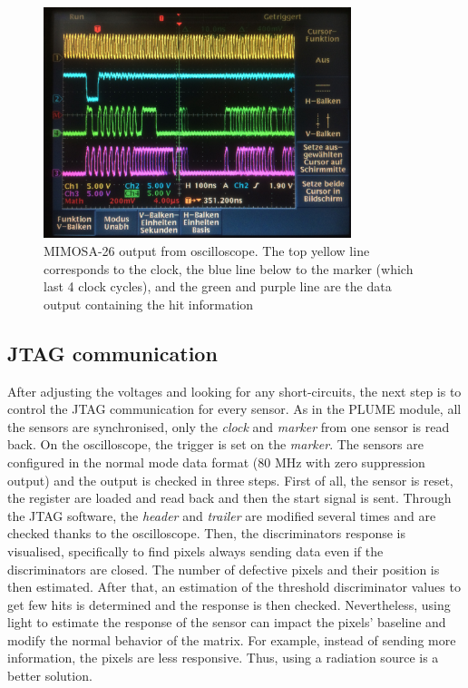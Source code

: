   \begin{figure}[h]
    \centering
    \includegraphics[width=0.8\textwidth]{Pictures/labTests/mi26_output}
    \caption{MIMOSA-26 output from oscilloscope. The top yellow line corresponds to the clock, the blue line below to the marker (which last 4 clock cycles), and the green and purple line are the data output containing the hit information}
    \label{fig:mi26Output}
  \end{figure}

  \subsection{JTAG communication}

  After adjusting the voltages and looking for any short-circuits, the next step is to control the JTAG communication for every sensor.
  As in the PLUME module, all the sensors are synchronised, only the \textit{clock} and \textit{marker} from one sensor is read back.
  On the oscilloscope, the trigger is set on the \textit{marker}.  
  The sensors are configured in the normal mode data format (80 MHz with zero suppression output) and the output is checked in three steps.
  First of all, the sensor is reset, the register are loaded and read back and then the start signal is sent. 
  Through the JTAG software, the \textit{header} and \textit{trailer} are modified several times and are checked thanks to the oscilloscope.
  Then, the discriminators response is visualised, specifically to find pixels always sending data even if the discriminators are closed.
  The number of defective pixels and their position is then estimated.
  After that, an estimation of the threshold discriminator values to get few hits is determined and the response is then checked.
  Nevertheless, using light to estimate the response of the sensor can impact the pixels' baseline and modify the normal behavior of the matrix.
  For example, instead of sending more information, the pixels are less responsive.
  Thus, using a radiation source is a better solution.


